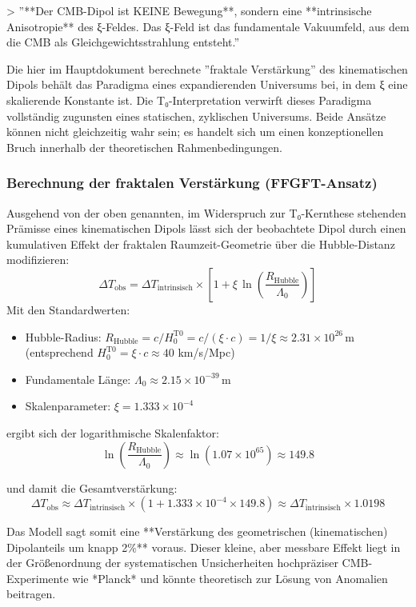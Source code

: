 \documentclass[12pt,a4paper]{article}
\begin{document}
	> ''**Der CMB-Dipol ist KEINE Bewegung**, sondern eine **intrinsische Anisotropie** des ξ-Feldes. Das ξ-Feld ist das fundamentale Vakuumfeld, aus dem die CMB als Gleichgewichtsstrahlung entsteht.''
	
	Die hier im Hauptdokument berechnete ''fraktale Verstärkung'' des kinematischen Dipols behält das Paradigma eines expandierenden Universums bei, in dem ξ eine skalierende Konstante ist. Die T₀-Interpretation verwirft dieses Paradigma vollständig zugunsten eines statischen, zyklischen Universums. Beide Ansätze können nicht gleichzeitig wahr sein; es handelt sich um einen konzeptionellen Bruch innerhalb der theoretischen Rahmenbedingungen.
	
	\subsubsection*{Berechnung der fraktalen Verstärkung (FFGFT-Ansatz)}
	
	Ausgehend von der oben genannten, im Widerspruch zur T₀-Kernthese stehenden Prämisse eines kinematischen Dipols lässt sich der beobachtete Dipol durch einen kumulativen Effekt der fraktalen Raumzeit-Geometrie über die Hubble-Distanz modifizieren:
	\[
	\Delta T_{\text{obs}} = \Delta T_{\text{intrinsisch}} \times \left[1 + \xi \, \ln\left(\frac{R_{\text{Hubble}}}{\Lambda_0}\right)\right]
	\]
	Mit den Standardwerten:
	\begin{itemize}
		\item Hubble-Radius: $R_{\text{Hubble}} = c/H_0^{\text{T0}} = c/(\xi \cdot c) = 1/\xi \approx 2.31 \times 10^{26} \, \text{m}$ (entsprechend $H_0^{\text{T0}} = \xi \cdot c \approx 40$ km/s/Mpc)
		\item Fundamentale Länge: $\Lambda_0 \approx 2.15 \times 10^{-39} \, \text{m}$
		\item Skalenparameter: $\xi = 1.333 \times 10^{-4}$
	\end{itemize}
	
	ergibt sich der logarithmische Skalenfaktor:
	\[
	\ln\left(\frac{R_{\text{Hubble}}}{\Lambda_0}\right) \approx \ln(1.07 \times 10^{65}) \approx 149.8
	\]
	
	und damit die Gesamtverstärkung:
	\[
	\Delta T_{\text{obs}} \approx \Delta T_{\text{intrinsisch}} \times (1 + 1.333\times10^{-4} \times 149.8) \approx \Delta T_{\text{intrinsisch}} \times 1.0198
	\]
	
	Das Modell sagt somit eine **Verstärkung des geometrischen (kinematischen) Dipolanteils um knapp 2\%** voraus. Dieser kleine, aber messbare Effekt liegt in der Größenordnung der systematischen Unsicherheiten hochpräziser CMB-Experimente wie *Planck* und könnte theoretisch zur Lösung von Anomalien beitragen.
	
\end{document}
